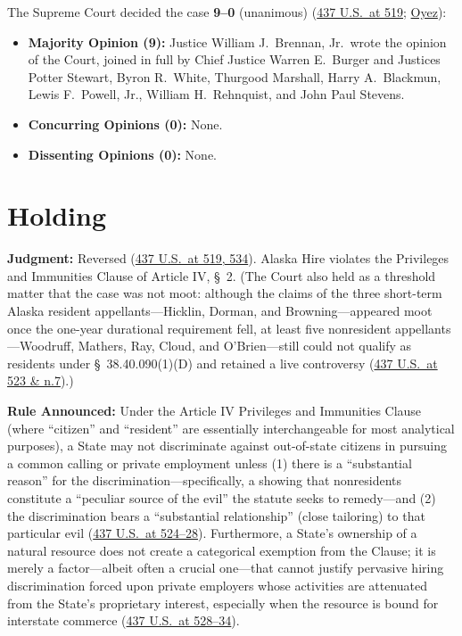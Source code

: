 \documentclass[12pt]{article}
\begin{document}
The Supreme Court decided the case \textbf{9--0} (unanimous) (\href{https://supreme.justia.com/cases/federal/us/437/518/}{437 U.S.\ at 519}; \href{https://www.oyez.org/cases/1977/77-324}{Oyez}):
\begin{itemize}
    \item \textbf{Majority Opinion (9):} Justice William J.\ Brennan, Jr.\ wrote the opinion of the Court, joined in full by Chief Justice Warren E.\ Burger and Justices Potter Stewart, Byron R.\ White, Thurgood Marshall, Harry A.\ Blackmun, Lewis F.\ Powell, Jr., William H.\ Rehnquist, and John Paul Stevens.
    \item \textbf{Concurring Opinions (0):} None.
    \item \textbf{Dissenting Opinions (0):} None.
\end{itemize}

\section{Holding}

\textbf{Judgment:} Reversed (\href{https://supreme.justia.com/cases/federal/us/437/518/}{437 U.S.\ at 519, 534}). Alaska Hire violates the Privileges and Immunities Clause of Article IV, \S\ 2. (The Court also held as a threshold matter that the case was not moot: although the claims of the three short-term Alaska resident appellants---Hicklin, Dorman, and Browning---appeared moot once the one-year durational requirement fell, at least five nonresident appellants---Woodruff, Mathers, Ray, Cloud, and O'Brien---still could not qualify as residents under \S\ 38.40.090(1)(D) and retained a live controversy (\href{https://supreme.justia.com/cases/federal/us/437/518/}{437 U.S.\ at 523 \& n.7}).)

\textbf{Rule Announced:} Under the Article IV Privileges and Immunities Clause (where ``citizen'' and ``resident'' are essentially interchangeable for most analytical purposes), a State may not discriminate against out-of-state citizens in pursuing a common calling or private employment unless (1) there is a ``substantial reason'' for the discrimination---specifically, a showing that nonresidents constitute a ``peculiar source of the evil'' the statute seeks to remedy---and (2) the discrimination bears a ``substantial relationship'' (close tailoring) to that particular evil (\href{https://supreme.justia.com/cases/federal/us/437/518/}{437 U.S.\ at 524--28}). Furthermore, a State's ownership of a natural resource does not create a categorical exemption from the Clause; it is merely a factor---albeit often a crucial one---that cannot justify pervasive hiring discrimination forced upon private employers whose activities are attenuated from the State's proprietary interest, especially when the resource is bound for interstate commerce (\href{https://supreme.justia.com/cases/federal/us/437/518/}{437 U.S.\ at 528--34}).
\end{document}

